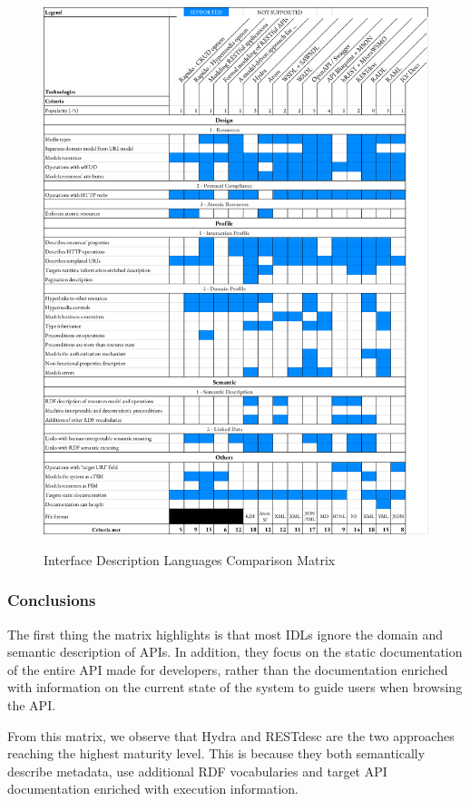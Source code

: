\begin{figure}[t]
\caption{Interface Description Languages Comparison Matrix}
\includegraphics[width=1\textwidth]{figures/IDL.png}
\label{idl-matrix}
\end{figure}

\subsubsection{Conclusions}

The first thing the matrix highlights is that most IDLs ignore the domain and semantic description of APIs. In addition, they focus on the static documentation of the entire API made for developers, rather than the documentation enriched with information on the current state of the system to guide users when browsing the API.

From this matrix, we observe that Hydra and RESTdesc are the two approaches reaching the highest maturity level. This is because they both semantically describe metadata, use additional RDF vocabularies and target API documentation enriched with execution information.

